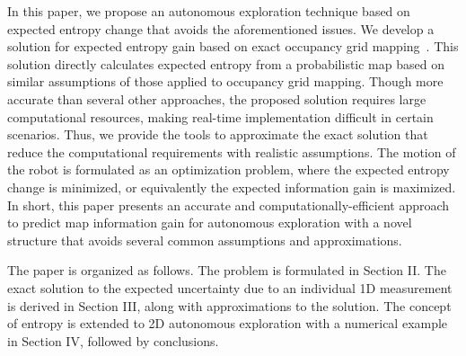 \documentclass[letterpaper, 10pt]{ieeeconf}
\begin{document}
In this paper, we propose an autonomous exploration technique based on expected entropy change that avoids the aforementioned issues. 
We develop a solution for expected entropy gain based on exact occupancy grid mapping~\cite{KauLeeAiMos16}. This solution directly calculates expected entropy from a probabilistic map based on similar assumptions of those applied to occupancy grid mapping.
Though more accurate than several other approaches, the proposed solution requires large computational resources, making real-time implementation difficult in certain scenarios.
Thus, we provide the tools to approximate the exact solution that reduce the computational requirements with realistic assumptions.
The motion of the robot is formulated as an optimization problem, where the expected entropy change is minimized, or equivalently the expected information gain is maximized.
In short, this paper presents an accurate and computationally-efficient approach to predict map information gain for autonomous exploration with a novel structure that avoids several common assumptions and approximations.

The paper is organized as follows. The problem is formulated in Section II. The exact solution to the expected uncertainty due to an individual 1D measurement is derived in Section III, along with approximations to the solution. The concept of entropy is extended to 2D autonomous exploration with a numerical example in Section IV, followed by conclusions.
\end{document}
